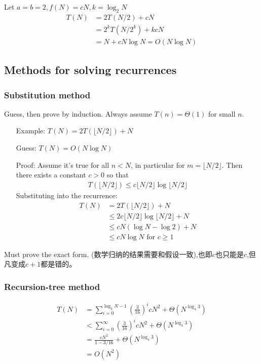 \documentclass{article}
\begin{document}
Let $a=b=2, f(N)=cN, k=\log_2 N$
\begin{align*}
    T(N)&=2T(N/2)+cN\\
    &=2^kT(N/2^k)+kcN\\
    &=N+cN\log N=O(N\log N)
\end{align*}

\subsection{Methods for solving recurrences}
\subsubsection{Substitution method}
Guess, then prove by induction. Always assume $T( n ) = \Theta ( 1 )$ for small $n$.
\begin{itemize}
    \item [Example:] $T(N)=2T(\lfloor N/2 \rfloor)+N$
    \item [Guess:] $T(N)=O(N\log N)$
    \item [Proof:] Assume it's true for all $n<N$, in particular for $m=\lfloor N/2 \rfloor$.
    \subitem Then there exists a constant $c>0$ so that
    \begin{align*}
        T(\lfloor N/2 \rfloor)\le c\lfloor N/2 \rfloor\log\lfloor N/2 \rfloor
    \end{align*}
    \subitem Substituting into the recurrence:
    \begin{align*}
        T(N)&=2T(\lfloor N/2 \rfloor)+N\\
        &\le 2c\lfloor N/2 \rfloor\log \lfloor N/2 \rfloor+N\\
        &\le cN(\log N-\log 2)+N\\
        &\le cN\log N \text{ for }c\ge 1
    \end{align*}
\end{itemize}
Must prove the exact form. (数学归纳的结果需要和假设一致),也即$c$也只能是$c$,但凡变成$c+1$都是错的。

\subsubsection{Recursion-tree method}
\begin{align*}
    T(N)&=\sum_{i=0}^{\log_4 N -1}\left( \frac{3}{16} \right)^i cN^2+\Theta(N^{\log_4 3})\\
    &<\sum_{i=0}^\infty \left( \frac{3}{16} \right)^i cN^2+\Theta(N^{\log_4 3})\\
    &=\frac{cN^2}{1-3/16}+\Theta(N^{\log_4 3})\\
    &=O(N^2)
\end{align*}
\end{document}
